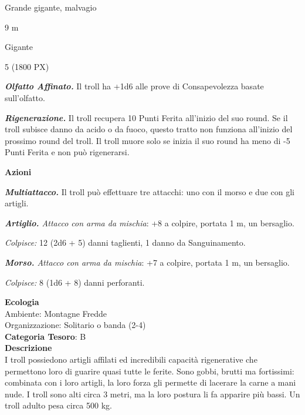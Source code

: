 \begin{multicols}{2}
{
\begin{description}[noitemsep, topsep=0pt, parsep=0pt, partopsep=0pt, itemsep=1pt, leftmargin=2.35cm,  labelwidth=2.2cm, itemindent=0cm, listparindent=0pt] %
\setlength{\baselineskip}{10pt}
\item[\textbf{Taglia/Tipo}] Grande gigante, malvagio
\item[\textbf{Caratt.}] 
\item[\textbf{Punti Ferita}] 
\item[\textbf{Movimento}] 9 m
\item[\textbf{Tiri Salvez.}] 
\item[\textbf{Sensi}] 
\item[\textbf{Linguaggi}] Gigante
\item[\textbf{Sfida}] 5 (1800 PX)
\end{description}
\smallskip

\emph{\textbf{Olfatto Affinato.}} Il troll ha +1d6 alle prove di Consapevolezza basate sull'olfatto.

\emph{\textbf{Rigenerazione.}} Il troll recupera 10 Punti Ferita all'inizio del suo round. Se il troll subisce danno da acido o da fuoco, questo tratto non funziona all'inizio del prossimo round del troll. Il troll muore solo se inizia il suo round ha meno di -5 Punti Ferita e non può rigenerarsi.

\textbf{Azioni}

\emph{\textbf{Multiattacco.}} Il troll può effettuare tre attacchi: uno con il morso e due con gli artigli.

\emph{\textbf{Artiglio.} Attacco con arma da mischia}: +8 a colpire, portata 1 m, un bersaglio.

\emph{Colpisce:} 12 (2d6 + 5) danni taglienti, 1 danno da Sanguinamento.

\emph{\textbf{Morso.} Attacco con arma da mischia}: +7 a colpire, portata 1 m, un bersaglio.

\emph{Colpisce:} 8 (1d6 + 8) danni perforanti.

\textbf{Ecologia}\\
Ambiente: Montagne Fredde\\
Organizzazione: Solitario o banda (2-4)\\
\textbf{Categoria Tesoro}: B\\
\textbf{Descrizione}\\
I troll possiedono artigli affilati ed incredibili capacità rigenerative che permettono loro di guarire quasi tutte le ferite. Sono gobbi, brutti ma fortissimi: combinata con i loro artigli, la loro forza gli permette di lacerare la carne a mani nude. I troll sono alti circa 3 metri, ma la loro postura li fa apparire più bassi. Un troll adulto pesa circa 500 kg.

}
\end{multicols}
